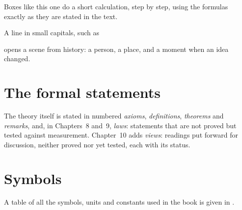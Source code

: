 \begin{workedexample}
Boxes like this one do a short calculation, step by step, using the formulas exactly as they are stated in the text.
\end{workedexample}

A line in small capitals, such as


\noindent opens a scene from history: a person, a place, and a moment when an idea changed.

\section*{The formal statements}
The theory itself is stated in numbered \emph{axioms}, \emph{definitions}, \emph{theorems} and \emph{remarks}, and, in Chapters~8 and~9, \emph{laws}: statements that are not proved but tested against measurement. Chapter~10 adds \emph{views}: readings put forward for discussion, neither proved nor yet tested, each with its status.

\section*{Symbols}
A table of all the symbols, units and constants used in the book is given in .
